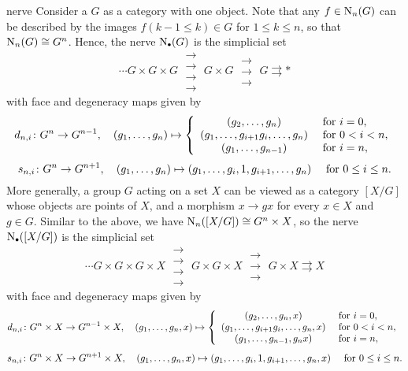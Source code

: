 \begin{example}{nerve}
    Consider a  $G$ as a category with one object. Note that any $f \in \textup{N}_n(G)$ can be described by the images $f(k - 1 \le k) \in G$ for $1 \le k \le n$, so that $\textup{N}_n(G) \cong G^n$. Hence, the nerve $\textup{N}_\bdot(G)$ is the simplicial set
    \[ \cdots G \times G \times G \; \substack{\rightarrow \\[-0.9em] \rightarrow \\[-0.9em] \rightarrow \\[-0.9em] \rightarrow} \; G \times G \; \substack{\rightarrow \\[-0.9em] \rightarrow \\[-0.9em] \rightarrow} \; G \rightrightarrows * \]
    with face and degeneracy maps given by
    \[ d_{n, i} \colon G^n \to G^{n - 1}, \quad (g_1, \ldots, g_n) \mapsto \left\{ \begin{array}{cl}
        (g_2, \ldots, g_n) & \textup{ for } i = 0, \\
        (g_1, \ldots, g_{i + 1} g_i, \ldots, g_n) & \textup{ for } 0 < i < n, \\
        (g_1, \ldots, g_{n - 1}) & \textup{ for } i = n,
    \end{array} \right. \]
    \[ s_{n, i} \colon G^n \to G^{n + 1}, \quad (g_1, \ldots, g_n) \mapsto (g_1, \ldots, g_i, 1, g_{i + 1}, \ldots, g_n) \quad \textup{ for } 0 \le i \le n . \]
    More generally, a group $G$ acting on a set $X$ can be viewed as a category $[X/G]$ whose objects are points of $X$, and a morphism $x \to gx$ for every $x \in X$ and $g \in G$. Similar to the above, we have $\textup{N}_n([X/G]) \cong G^n \times X$, so the nerve $\textup{N}_\bdot([X/G])$ is the simplicial set
    \[ \cdots G \times G \times G \times X \; \substack{\rightarrow \\[-0.9em] \rightarrow \\[-0.9em] \rightarrow \\[-0.9em] \rightarrow} \; G \times G \times X \; \substack{\rightarrow \\[-0.9em] \rightarrow \\[-0.9em] \rightarrow} \; G \times X \rightrightarrows X \]
    with face and degeneracy maps given by
    \[ d_{n, i} \colon G^n \times X \to G^{n - 1} \times X, \quad (g_1, \ldots, g_n, x) \mapsto \left\{ \begin{array}{cl}
        (g_2, \ldots, g_n, x) & \textup{ for } i = 0, \\
        (g_1, \ldots, g_{i + 1} g_i, \ldots, g_n, x) & \textup{ for } 0 < i < n, \\
        (g_1, \ldots, g_{n - 1}, g_n x) & \textup{ for } i = n,
    \end{array} \right. \]
    \[ s_{n, i} \colon G^n \times X \to G^{n + 1} \times X, \quad (g_1, \ldots, g_n, x) \mapsto (g_1, \ldots, g_i, 1, g_{i + 1}, \ldots, g_n, x) \quad \textup{ for } 0 \le i \le n . \]
\end{example}

